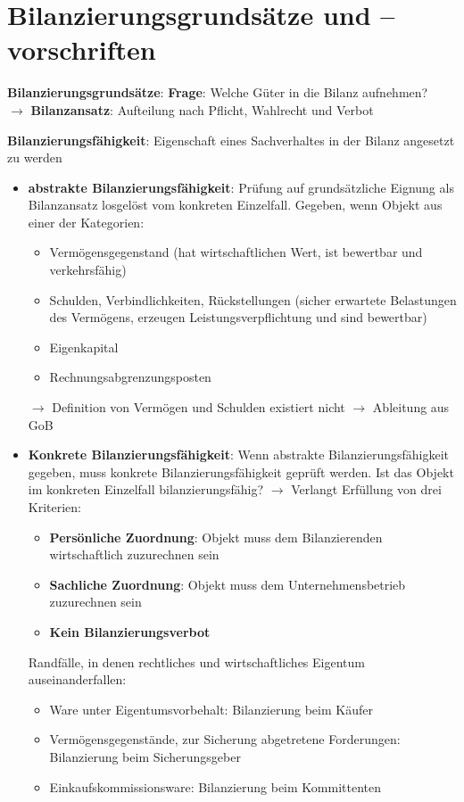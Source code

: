\section{Bilanzierungsgrundsätze und –vorschriften}

\textbf{Bilanzierungsgrundsätze}: \textbf{Frage}: Welche Güter in die Bilanz aufnehmen?\\
$\rightarrow$ \textbf{Bilanzansatz}: Aufteilung nach Pflicht, Wahlrecht und Verbot

\textbf{Bilanzierungsfähigkeit}: Eigenschaft eines Sachverhaltes in der Bilanz angesetzt zu werden
\begin{itemize}
	\item \textbf{abstrakte Bilanzierungsfähigkeit}: Prüfung auf grundsätzliche Eignung als Bilanzansatz losgelöst vom konkreten Einzelfall. Gegeben, wenn Objekt aus einer der Kategorien:
	\begin{itemize}
		\item Vermögensgegenstand (hat wirtschaftlichen Wert, ist bewertbar und verkehrsfähig)
		\item Schulden, Verbindlichkeiten, Rückstellungen (sicher erwartete Belastungen des Vermögens, erzeugen Leistungsverpflichtung und sind bewertbar)
		\item Eigenkapital
		\item Rechnungsabgrenzungsposten
	\end{itemize}
	$\rightarrow$ Definition von Vermögen und Schulden existiert nicht $\rightarrow$ Ableitung aus GoB
	\item \textbf{Konkrete Bilanzierungsfähigkeit}: Wenn abstrakte Bilanzierungsfähigkeit gegeben, muss
	konkrete Bilanzierungsfähigkeit geprüft werden. Ist das Objekt im konkreten Einzelfall bilanzierungsfähig? $\rightarrow$ Verlangt Erfüllung von drei Kriterien:
	\begin{itemize}
		\item \textbf{Persönliche Zuordnung}: Objekt muss dem Bilanzierenden wirtschaftlich zuzurechnen sein
		\item \textbf{Sachliche Zuordnung}: Objekt muss dem Unternehmensbetrieb zuzurechnen sein 
		\item \textbf{Kein Bilanzierungsverbot}
	\end{itemize}
	Randfälle, in denen rechtliches und wirtschaftliches Eigentum auseinanderfallen: 
	\begin{itemize}
		\item Ware unter Eigentumsvorbehalt: Bilanzierung beim Käufer
		\item Vermögensgegenstände, zur Sicherung abgetretene Forderungen: Bilanzierung beim Sicherungsgeber
		\item Einkaufskommissionsware: Bilanzierung beim Kommittenten
	\end{itemize}
\end{itemize}



